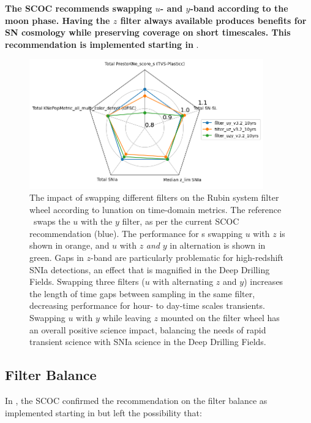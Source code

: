 {\bf The SCOC recommends swapping $u$- and $y$-band according to the moon phase. Having the $z$ filter always available produces benefits for SN cosmology while preserving coverage on short timescales. This recommendation is implemented starting in }.

\begin{figure}
  \centering
\includegraphics[width=0.9\textwidth]{figures/filter_swap_KNe.png}
\caption{The impact of swapping different filters on the Rubin system filter wheel according to lunation on time-domain metrics. The reference \opsim\ swaps the $u$ with the $y$ filter, as per the current SCOC recommendation (blue). The performance for \opsim s swapping $u$ with $z$ is shown in orange, and $u$ with $z$ {\it and} $y$ in alternation is shown in green. Gaps in $z$-band are particularly problematic for high-redshift SNIa detections, an effect that is magnified in the Deep Drilling Fields. %
Swapping three filters ($u$ with alternating $z$ and $y$) increases the length of time gaps between sampling in the same filter, decreasing performance for hour- to day-time scales transients.
Swapping $u$ with $y$ while leaving $z$ mounted on the filter wheel has an overall positive science impact, balancing the needs of rapid transient science with SNIa science in the Deep Drilling Fields. }
\label{fig:swapping}
\end{figure}

\FloatBarrier
\subsection{Filter Balance}\label{sec:filterbalance}
 In , the SCOC confirmed the recommendation on the filter balance as implemented starting in  but left the possibility that:
  
